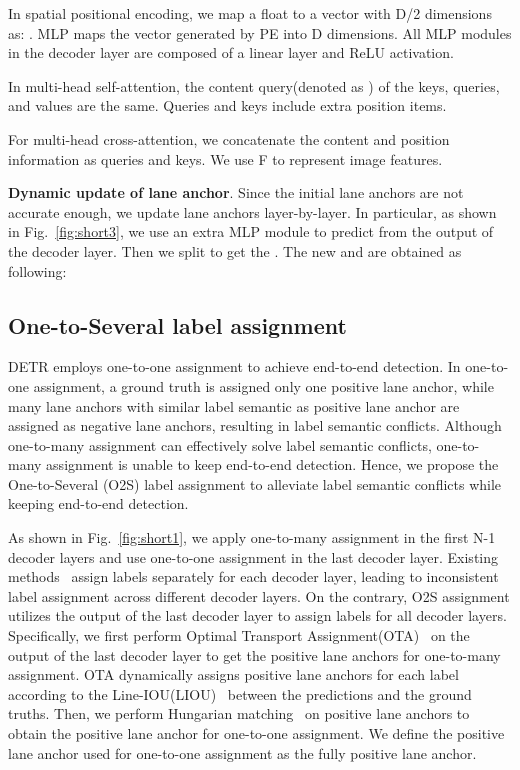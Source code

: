 \documentclass{bmvc2k}
\begin{document}
 In spatial positional encoding, we map a float to a vector with D/2 dimensions as: . 
MLP maps the vector generated by PE into D dimensions. All MLP modules in the decoder layer are composed of a linear layer and ReLU activation. 

In multi-head self-attention, the content query(denoted as ) of the keys, queries, and values are the same. Queries and keys include extra position items.


For multi-head cross-attention, we concatenate the content and position information as queries and keys. We use F to represent image features.


{\bf Dynamic update of lane anchor}. Since the initial lane anchors are not accurate enough, we update lane anchors layer-by-layer. 
In particular, as shown in Fig.~\ref{fig:short3}, we use an extra MLP module to predict  from the output of the decoder layer. 
Then we split  to get the . The new  and  are obtained as following:



\subsection{One-to-Several label assignment}
\label{sec:assignment}
DETR employs one-to-one assignment to achieve end-to-end detection. In one-to-one 
assignment, a ground truth is assigned only one positive lane anchor, while many lane anchors 
with similar label semantic as positive lane anchor are assigned as negative lane anchors, resulting in label semantic  
conflicts. Although one-to-many assignment can effectively solve label semantic conflicts, 
one-to-many assignment is unable to keep end-to-end detection. 
Hence, we propose the One-to-Several (O2S) label assignment to alleviate label semantic conflicts while keeping end-to-end detection. 

As shown in Fig.~\ref{fig:short1}, we apply one-to-many assignment in the first N-1 decoder layers and use one-to-one assignment in the last decoder layer. Existing methods~\cite{zhang2020bridging,kim2020probabilistic} assign labels separately for each decoder layer, 
leading to inconsistent label assignment across different decoder layers. On the contrary, O2S assignment
utilizes the output of the last decoder layer to assign labels for all decoder layers. 
Specifically, we first perform Optimal Transport Assignment(OTA)~\cite{ge2021ota} on the output of the last decoder layer to get the positive lane anchors for one-to-many assignment. 
OTA dynamically assigns  positive lane anchors for each label
according to the Line-IOU(LIOU)~\cite{zheng2022clrnet} between the predictions and the ground truths.  
Then, we perform Hungarian matching~\cite{carion2020end} on  positive lane anchors to obtain the positive lane anchor for one-to-one assignment.
We define the positive lane anchor used for one-to-one assignment as the fully positive lane anchor. 
\end{document}
